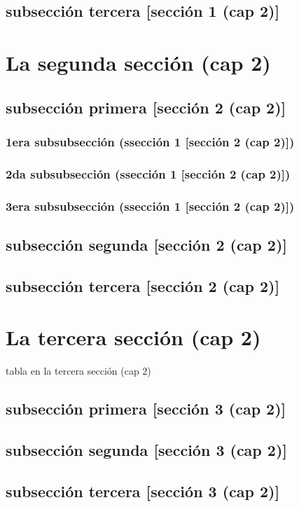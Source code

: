 \documentclass[12pt,a4paper]{report}
\begin{document}
\subsection*{subsección tercera [sección 1 (cap 2)]}
\section*{La segunda sección (cap 2)}
\subsection*{subsección primera [sección 2 (cap 2)]}
\subsubsection*{1era subsubsección (ssección 1 [sección 2 (cap 2)])}
\subsubsection*{2da subsubsección (ssección 1 [sección 2 (cap 2)])}
\subsubsection*{3era subsubsección (ssección 1 [sección 2 (cap 2)])}
\subsection*{subsección segunda [sección 2 (cap 2)]}
\subsection*{subsección tercera [sección 2 (cap 2)]}
\section*{La tercera sección (cap 2)}
\begin{table}[H]
\caption{tabla en la tercera sección (cap 2)}
\end{table}
\subsection*{subsección primera [sección 3 (cap 2)]}
\subsection*{subsección segunda [sección 3 (cap 2)]}
\subsection*{subsección tercera [sección 3 (cap 2)]}
\end{document}

